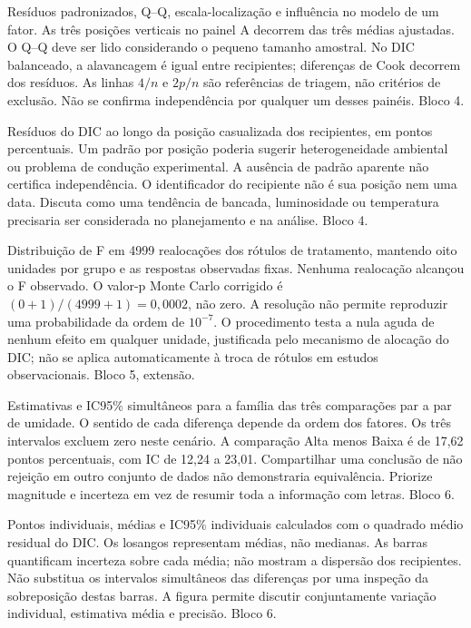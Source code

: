 {Resíduos padronizados, Q--Q, escala-localização e influência no modelo de um fator.}
{As três posições verticais no painel A decorrem das três médias ajustadas. O Q--Q deve ser lido considerando o pequeno tamanho amostral. No DIC balanceado, a alavancagem é igual entre recipientes; diferenças de Cook decorrem dos resíduos. As linhas $4/n$ e $2p/n$ são referências de triagem, não critérios de exclusão. Não se confirma independência por qualquer um desses painéis. Bloco 4.}

{Resíduos do DIC ao longo da posição casualizada dos recipientes, em pontos percentuais.}
{Um padrão por posição poderia sugerir heterogeneidade ambiental ou problema de condução experimental. A ausência de padrão aparente não certifica independência. O identificador do recipiente não é sua posição nem uma data. Discuta como uma tendência de bancada, luminosidade ou temperatura precisaria ser considerada no planejamento e na análise. Bloco 4.}

{Distribuição de F em 4999 realocações dos rótulos de tratamento, mantendo oito unidades por grupo e as respostas observadas fixas.}
{Nenhuma realocação alcançou o F observado. O valor-p Monte Carlo corrigido é $(0+1)/(4999+1)=0{,}0002$, não zero. A resolução não permite reproduzir uma probabilidade da ordem de $10^{-7}$. O procedimento testa a nula aguda de nenhum efeito em qualquer unidade, justificada pelo mecanismo de alocação do DIC; não se aplica automaticamente à troca de rótulos em estudos observacionais. Bloco 5, extensão.}

{Estimativas e IC95\% simultâneos para a família das três comparações par a par de umidade.}
{O sentido de cada diferença depende da ordem dos fatores. Os três intervalos excluem zero neste cenário. A comparação Alta menos Baixa é de 17,62 pontos percentuais, com IC de 12,24 a 23,01. Compartilhar uma conclusão de não rejeição em outro conjunto de dados não demonstraria equivalência. Priorize magnitude e incerteza em vez de resumir toda a informação com letras. Bloco 6.}

{Pontos individuais, médias e IC95\% individuais calculados com o quadrado médio residual do DIC.}
{Os losangos representam médias, não medianas. As barras quantificam incerteza sobre cada média; não mostram a dispersão dos recipientes. Não substitua os intervalos simultâneos das diferenças por uma inspeção da sobreposição destas barras. A figura permite discutir conjuntamente variação individual, estimativa média e precisão. Bloco 6.}

